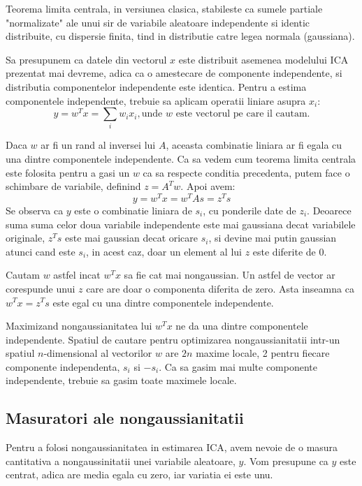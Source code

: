 \documentclass[12pt]{article}
\begin{document}
 Teorema limita centrala, in versiunea clasica, stabileste ca sumele partiale "normalizate" ale unui sir de variabile aleatoare independente si identic distribuite, cu dispersie finita, tind in distributie catre legea normala (gaussiana). 

 Sa presupunem ca datele din vectorul $x$ este distribuit asemenea modelului ICA prezentat mai devreme, adica ca o amestecare de componente independente, si distributia componentelor independente este  identica. Pentru a estima componentele independente, trebuie sa aplicam operatii liniare asupra $x_i$:
 \begin{equation}
	y=w^Tx=\sum_{i}w_ix_i, \text{unde $w$ este vectorul pe care il cautam.}
 \end{equation}

 Daca $w$ ar fi un rand al inversei lui $A$, aceasta combinatie liniara ar fi egala cu una dintre componentele independente. Ca sa vedem cum teorema limita centrala este folosita pentru a gasi un $w$ ca sa respecte conditia precedenta, putem face o schimbare de variabile, definind $z=A^Tw$. Apoi avem:
 \begin{equation}
	 y=w^Tx=w^TAs=z^Ts
 \end{equation}
 Se observa ca $y$ este o combinatie liniara de $s_i$, cu ponderile date de $z_i$. Deoarece suma suma celor doua variabile independente este mai gaussiana decat variabilele originale, $z^Ts$ este mai gaussian decat oricare $s_i$, si devine mai putin gaussian atunci cand este $s_i$, in acest caz, doar un element al lui $z$ este diferite de 0. 
 
 Cautam $w$ astfel incat $w^Tx$ sa fie cat mai nongaussian. Un astfel de vector ar corespunde unui $z$ care are doar o componenta diferita de zero. Asta inseamna ca $w^Tx=z^Ts$ este egal cu una dintre componentele independente.

 Maximizand nongaussianitatea lui $w^Tx$ ne da una dintre componentele independente. Spatiul de cautare pentru optimizarea nongaussianitatii intr-un spatiul $n$-dimensional al vectorilor $w$ are $2n$ maxime locale, 2 pentru fiecare componente independenta, $s_i$ si $-s_i$. Ca sa gasim mai multe componente independente, trebuie sa gasim toate maximele locale.  
\newpage
\subsection{Masuratori ale nongaussianitatii}
Pentru a folosi nongaussianitatea in estimarea ICA, avem nevoie de o masura cantitativa a nongaussinitatii unei variabile aleatoare, $y$. Vom presupune ca $y$ este centrat, adica are media egala cu zero, iar variatia ei este unu. 
\end{document}
